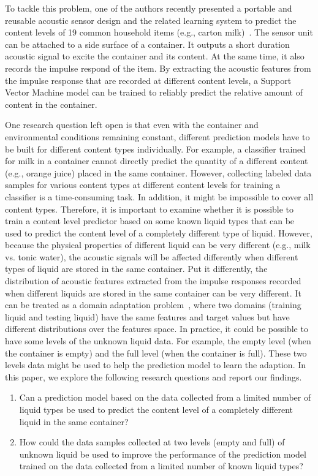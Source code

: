 \documentclass{article} %
\begin{document}
To tackle this problem, one of the authors recently presented a portable and reusable acoustic sensor design and the related learning system to predict the content levels of 19 common household items (e.g., carton milk)~\cite{fan2015soqr}. The sensor unit can be attached to a side surface of a container. It outputs a short duration acoustic signal to excite the container and its content. At the same time, it also records the impulse respond of the item. By extracting the acoustic features from the impulse response that are recorded at different content levels, a Support Vector Machine model can be trained to reliably predict the relative amount of content in the container.

One research question left open is that even with the container and environmental conditions remaining constant, different prediction models have to be built for different content types individually. For example, a classifier trained for milk in a container cannot directly predict the quantity of a different content (e.g., orange juice) placed in the same container. However, collecting labeled data samples for various content types at different content levels for training a classifier is a time-consuming task. In addition, it might be impossible to cover all content types. Therefore, it is important to examine whether it is possible to train a content level predictor based on some known liquid types that can be used to predict the content level of a completely different type of liquid. However, because the physical properties of different liquid can be very different (e.g., milk vs. tonic water), the acoustic signals will be affected differently when different types of liquid are stored in the same container. Put it differently, the distribution of acoustic features extracted from the impulse responses recorded when different liquids are stored in the same container can be very different. It can be treated as a domain adaptation problem~\cite{pan2010survey}, where two domains (training liquid and testing liquid) have the same features and target values but have different distributions over the features space. In practice, it could be possible to have some levels of the unknown liquid data. For example, the empty level (when the container is empty) and the full level (when the container is full). These two levels data might be used to help the prediction model to learn the adaption. In this paper, we explore the following research questions and report our findings. 

\begin{enumerate}
\item Can a prediction model based on the data collected from a limited number of liquid types be used to predict the content level of a completely different liquid in the same container?
\item How could the data samples collected at two levels (empty and full) of unknown liquid be used to improve the performance of the prediction model trained on the data collected from a limited number of known liquid types?  
\end{enumerate}
\end{document}
